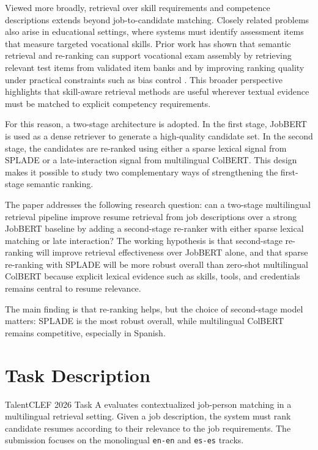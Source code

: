 \documentclass[
]{ceurart}
\begin{document}
Viewed more broadly, retrieval over skill requirements and competence descriptions
extends beyond job-to-candidate matching. Closely related problems also arise in
educational settings, where systems must identify assessment items that measure
targeted vocational skills. Prior work has shown that semantic retrieval and
re-ranking can support vocational exam assembly by retrieving relevant test items
from validated item banks and by improving ranking quality under practical constraints
such as bias control \cite{palomino2024edtec,palomino2025bias}. This broader perspective
highlights that skill-aware retrieval methods are useful wherever textual evidence
must be matched to explicit competency requirements.

For this reason, a two-stage architecture is adopted. In the first stage,
JobBERT is used as a dense retriever to generate a high-quality candidate set.
In the second stage, the candidates are re-ranked using either a sparse lexical
signal from SPLADE or a late-interaction signal from multilingual ColBERT.
This design makes it possible to study two complementary ways of strengthening
the first-stage semantic ranking.

The paper addresses the following research question: can a two-stage multilingual
retrieval pipeline improve resume retrieval from job descriptions over a strong
JobBERT baseline by adding a second-stage re-ranker with either sparse lexical
matching or late interaction? The working hypothesis is that second-stage re-ranking
will improve retrieval effectiveness over JobBERT alone, and that sparse re-ranking
with SPLADE will be more robust overall than zero-shot multilingual ColBERT because
explicit lexical evidence such as skills, tools, and credentials remains central to
resume relevance.

The main finding is that re-ranking helps, but the choice of second-stage model matters:
SPLADE is the most robust overall, while multilingual ColBERT remains competitive,
especially in Spanish.

\section{Task Description}

TalentCLEF 2026 Task A evaluates contextualized job-person matching in a multilingual
retrieval setting. Given a job description, the system must rank candidate resumes
according to their relevance to the job requirements. The submission focuses on the monolingual
\texttt{en-en} and \texttt{es-es} tracks.
\end{document}
